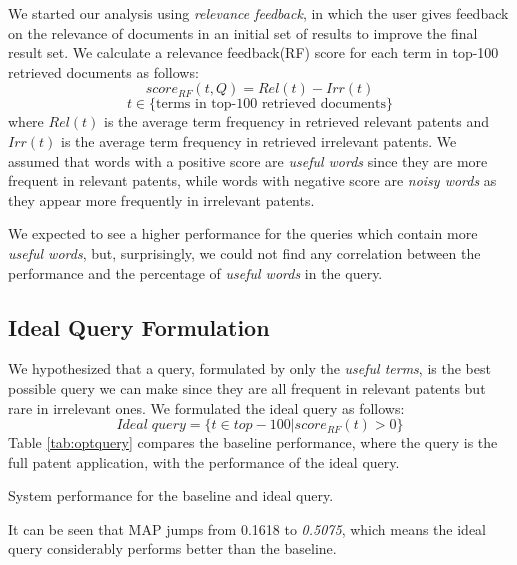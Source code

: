 \documentclass{sig-alternate}
\begin{document}
We started our analysis using {\em relevance feedback}, in which the user gives feedback on the relevance of documents in an initial set of results to improve the final result set. We calculate a relevance feedback(RF) score for each term in top-100 retrieved documents as follows:
\begin{equation}
score_{RF}(t,Q)=Rel(t)-Irr(t) 
 \label{eq:score}
\end{equation}\vspace*{-5ex}
\begin{displaymath}t\in \lbrace \mbox{terms in top-100 retrieved documents}\rbrace\end{displaymath}
where $ Rel(t) $ is the average term frequency in retrieved relevant patents and $ Irr(t) $ is the average term frequency in retrieved irrelevant patents. We assumed that words with a positive score are {\em useful words} since they are more frequent in relevant patents, while words with negative score are {\em noisy words} as they appear more frequently in irrelevant patents. 

We expected to see a higher performance for the queries which contain more {\em useful words}, but, surprisingly, we could not find any correlation between the performance and the percentage of {\em useful words} in the query. 

\subsection{Ideal Query Formulation}
We hypothesized that a query, formulated by only the {\em useful terms}, is the best possible query we can make since they are all frequent in relevant patents but rare in irrelevant ones. We formulated the ideal query as follows: 
\begin{equation}
Ideal\; query = \{t \in top-100|score_{RF}(t)>0\}   
 \label{eq:score}
\end{equation}
Table \ref{tab:optquery} compares the baseline performance, where the query is the full patent application, with the performance of the ideal query. 
\begin{table}[htpb]
  \begin{center}
   \caption{System performance for the baseline and ideal query.}
     
  \label{tab:optquery}
  \end{center}  
\end{table}
It can be seen that MAP jumps from 0.1618 to {\em 0.5075}, which means the ideal query considerably performs better than the baseline. 
\end{document}
